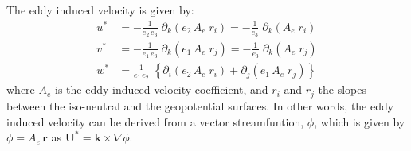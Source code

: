 \documentclass[../main/NEMO_manual]{subfiles}
\begin{document}
The eddy induced velocity is given by: 
\begin{equation}
  \label{eq:eiv_v}
  \begin{split}
    u^* & = - \frac{1}{e_2\,e_{3}}          \;\partial_k \left( e_2 \, A_e \; r_i  \right)
    = - \frac{1}{e_3}                     \;\partial_k \left(           A_e \; r_i  \right)            \\
    v^* & = - \frac{1}{e_1\,e_3}\;             \partial_k \left( e_1 \, A_e \; r_j  \right)
    = - \frac{1}{e_3}                     \;\partial_k \left(           A_e \; r_j  \right)             \\
    w^* & =    \frac{1}{e_1\,e_2}\; \left\{   \partial_i  \left( e_2 \, A_e \; r_i  \right)
      + \partial_j  \left( e_1 \, A_e \;r_j   \right) \right\}
  \end{split}
\end{equation}
where $A_{e}$ is the eddy induced velocity coefficient,
and $r_i$ and $r_j$ the slopes between the iso-neutral and the geopotential surfaces.
In other words, the eddy induced velocity can be derived from a vector streamfuntion, $\phi$,
which is given by $\phi = A_e\,\textbf{r}$ as $\textbf{U}^*  = \textbf{k} \times \nabla \phi$.
\end{document}
